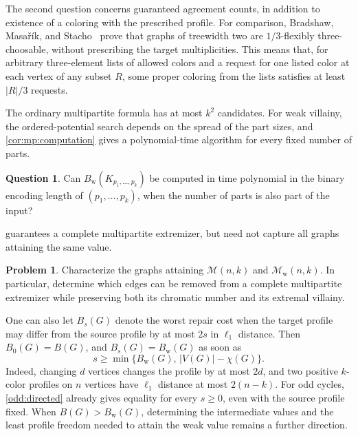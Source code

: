 \documentclass[10pt,a4paper]{amsart}
\numberwithin{equation}{section}
\theoremstyle{definition}
\newtheorem{problem}[theorem]{Problem}
\newtheorem{question}[theorem]{Question}
\theoremstyle{remark}
\begin{document}
The second question concerns guaranteed agreement counts, in addition
to existence of a coloring with the prescribed profile. For comparison,
Bradshaw, Masa\v{r}\'ik, and Stacho~\cite{bradshaw2022} prove that
graphs of treewidth two are $1/3$-flexibly three-choosable, without
prescribing the target multiplicities. This means that, for arbitrary
three-element lists of allowed colors and a request for one listed
color at each vertex of any subset $R$, some proper coloring from the
lists satisfies at least $|R|/3$ requests.

The ordinary multipartite formula has at most $k^2$ candidates.
For weak villainy, the ordered-potential search depends on the
spread of the part sizes, and \cref{cor:mp:computation} gives a
polynomial-time algorithm for every fixed number of parts.

\begin{question}\label{question:weak-arithmetic}
Can $B_{\mathrm w}(K_{p_1,\ldots,p_k})$ be computed in time
polynomial in the binary encoding length of $(p_1,\ldots,p_k)$,
when the number of parts is also part of the input?
\end{question}

 guarantees a complete multipartite extremizer,
but need not capture all graphs attaining the same value.

\begin{problem}\label{problem:extremal-structure}
Characterize the graphs attaining $\mathcal M(n,k)$ and
$\mathcal M_{\mathrm w}(n,k)$. In particular, determine which edges
can be removed from a complete multipartite extremizer while preserving
both its chromatic number and its extremal villainy.
\end{problem}

One can also let $B_s(G)$ denote the worst repair cost when the target
profile may differ from the source profile by at most $2s$ in
$\ell_1$ distance. Then $B_0(G)=B(G)$, and $B_s(G)=B_{\mathrm w}(G)$
as soon as
\[
 s\ge\min\{B_{\mathrm w}(G),\,|V(G)|-\chi(G)\}.
\]
Indeed, changing $d$ vertices changes the profile by at most $2d$,
and two positive $k$-color profiles on $n$ vertices have
$\ell_1$ distance at most $2(n-k)$.
For odd cycles, \cref{odd:directed} already gives equality for every
$s\ge0$, even with the source profile fixed. When
$B(G)>B_{\mathrm w}(G)$, determining the intermediate values and the
least profile freedom needed to attain the weak value remains a
further direction.

\end{document}
